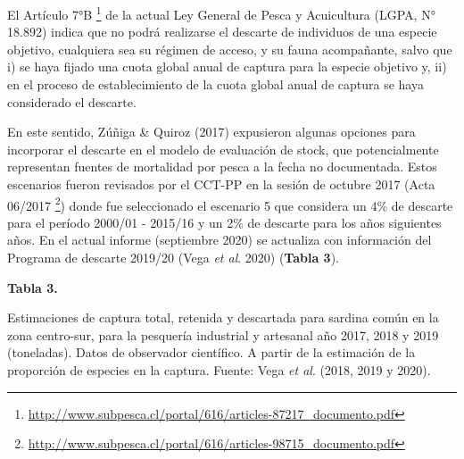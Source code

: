 \documentclass[
  spanish,
]{article}
\begin{document}
El Artículo 7°B \footnote{\url{http://www.subpesca.cl/portal/616/articles-87217_documento.pdf}}
de la actual Ley General de Pesca y Acuicultura (LGPA, N° 18.892) indica
que no podrá realizarse el descarte de individuos de una especie
objetivo, cualquiera sea su régimen de acceso, y su fauna acompañante,
salvo que i) se haya fijado una cuota global anual de captura para la
especie objetivo y, ii) en el proceso de establecimiento de la cuota
global anual de captura se haya considerado el descarte.

En este sentido, Zúñiga \& Quiroz (2017) expusieron algunas opciones
para incorporar el descarte en el modelo de evaluación de stock, que
potencialmente representan fuentes de mortalidad por pesca a la fecha no
documentada. Estos escenarios fueron revisados por el CCT-PP en la
sesión de octubre 2017 (Acta 06/2017 \footnote{\url{http://www.subpesca.cl/portal/616/articles-98715_documento.pdf}})
donde fue seleccionado el escenario 5 que considera un 4\% de descarte
para el período 2000/01 - 2015/16 y un 2\% de descarte para los años
siguientes años. En el actual informe (septiembre 2020) se actualiza con
información del Programa de descarte 2019/20 (Vega \emph{et al}. 2020)
(\textbf{Tabla 3}).

\small
\begin{center} 
\textbf{Tabla 3.}
\end{center}
\begin{center} 
\vspace{-0.2cm} Estimaciones de captura total, retenida y descartada para sardina común en la zona centro-sur, para la pesquería industrial y artesanal año 2017, 2018 y 2019 (toneladas).  Datos de observador científico. A partir de la estimación de la proporción de especies en la captura. Fuente: Vega \textit{et al}. (2018, 2019 y 2020).
\end{center}
\vspace{-0.2cm}
\end{document}
